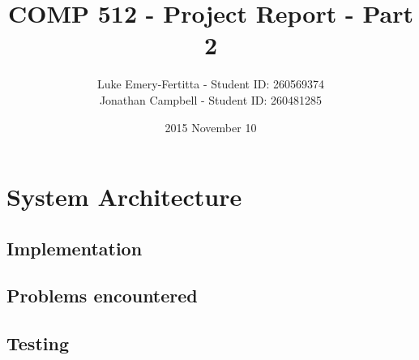 \documentclass[11pt]{article}
\begin{document}
\title{COMP 512 - Project Report - Part 2}
\author{Luke Emery-Fertitta - Student ID: 260569374 \\ Jonathan Campbell - Student ID: 260481285}
\date{2015 November 10}
\maketitle

\section*{System Architecture}


\subsection*{Implementation}


\subsection*{Problems encountered}


\subsection*{Testing}
\end{document}
